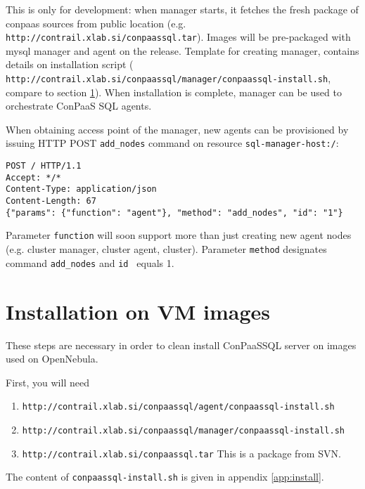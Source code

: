 \documentclass[a4paper,10pt]{article}
\begin{document}
This is only for development: when manager starts, it fetches the fresh package of conpaas sources from public location (e.g. \\{\tt http://contrail.xlab.si/conpaassql.tar}). Images will be pre-packaged with mysql manager and agent on the release. Template for creating manager, contains details on installation script (\\{\tt http://contrail.xlab.si/conpaassql/manager/conpaassql-install.sh}, compare to section \ref{sec:install}). When installation is complete, manager can be used to orchestrate ConPaaS SQL agents.

When obtaining access point of the manager, new agents can be provisioned by issuing HTTP POST {\tt add\_nodes} command on resource {\tt sql-manager-host:/}:

\begin{verbatim}
POST / HTTP/1.1
Accept: */*
Content-Type: application/json
Content-Length: 67
{"params": {"function": "agent"}, "method": "add_nodes", "id": "1"}
\end{verbatim}

Parameter {\tt function} will soon support more than just creating new agent nodes (e.g. cluster manager, cluster agent, cluster). Parameter {\tt method} designates command {\tt add\_nodes} and {\tt id } equals 1. 

\section{Installation on VM images}
\label{sec:install}

These steps are necessary in order to clean install ConPaaSSQL server on images used on OpenNebula.

First, you will need
\begin{enumerate}
\item {\tt http://contrail.xlab.si/conpaassql/agent/conpaassql-install.sh}
\item {\tt http://contrail.xlab.si/conpaassql/manager/conpaassql-install.sh}
\item {\tt http://contrail.xlab.si/conpaassql.tar} This is a package from SVN.
\end{enumerate}


The content of {\tt conpaassql-install.sh} is given in appendix \ref{app:install}.
\end{document}
